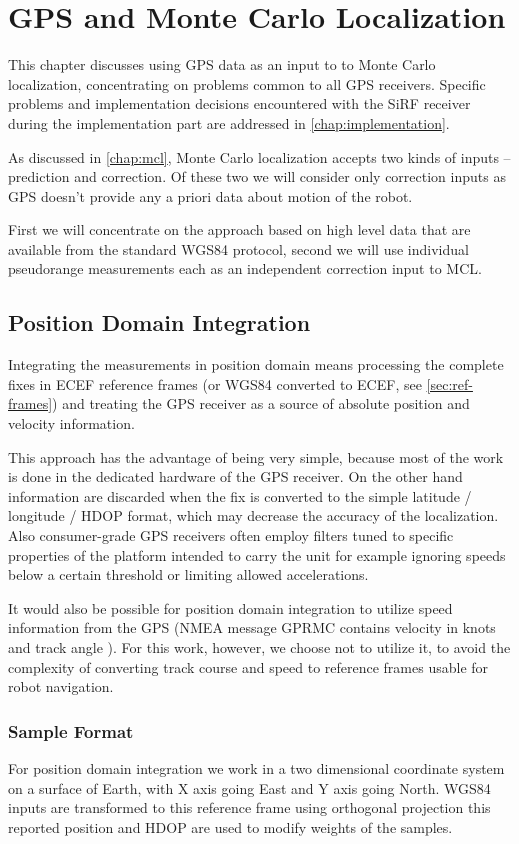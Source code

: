 \chapter{GPS and Monte Carlo Localization}
\label{chap:gps-and-mcl}

This chapter discusses using GPS data as an input to to Monte Carlo localization,
concentrating on problems common to all GPS receivers.
Specific problems and implementation decisions encountered with the SiRF receiver
during the implementation part are addressed in \cref{chap:implementation}.

As discussed in \cref{chap:mcl}, Monte Carlo localization accepts two kinds of
inputs -- prediction and correction.
Of these two we will consider only correction inputs as GPS doesn't provide any
a priori data about motion of the robot.

First we will concentrate on the approach based on high level data that are available
from the standard WGS84 protocol,
second we will use individual pseudorange measurements each as an independent
correction input to MCL.

\section{Position Domain Integration}
Integrating the measurements in position domain means processing the complete
fixes in ECEF reference frames (or WGS84 converted to ECEF, see \cref{sec:ref-frames})
and treating the GPS receiver as a source of absolute position and velocity information.

This approach has the advantage of being very simple, because most of the work
is done in the dedicated hardware of the GPS receiver.
On the other hand information are discarded when the fix is converted to the simple
latitude / longitude / HDOP format, which may decrease the accuracy of the
localization.
Also consumer-grade GPS receivers often employ filters tuned to specific properties
of the platform intended to carry the unit for example ignoring speeds
below a certain threshold or limiting allowed accelerations.

It would also be possible for position domain integration to utilize speed information
from the GPS (NMEA message GPRMC contains velocity in knots and track angle \cite{depriest}).
For this work, however, we choose not to utilize it, to avoid the complexity of converting
track course and speed to reference frames usable for robot navigation.

\subsection{Sample Format}
For position domain integration we work in a two dimensional coordinate
system on a surface of Earth, with X axis going East and Y axis going North.
WGS84 inputs are transformed to this reference frame using orthogonal projection
this reported position and HDOP are used to modify weights of the samples.

